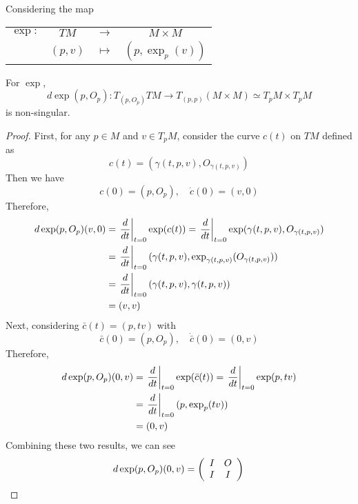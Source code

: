 \noindent Considering the map
\begin{center}
	\begin{tabular}{cccc}
		$\exp \colon$ & $TM$ & $\longrightarrow$ & $M \times M$ \\
		~& $(p,v)$ & $\mapsto$ & $(p,\exp_p(v))$
	\end{tabular}
\end{center}
\begin{lem}
	For $\exp$,
	\begin{equation*}
		d\exp(p,O_p) \colon T_{(p,O_p)}TM \longrightarrow T_{(p,p)}(M \times M) \simeq T_pM \times T_pM
	\end{equation*}
	is non-singular.
\end{lem}
\begin{proof}
	First, for any $p \in M$ and $v \in T_pM$, consider the curve $c(t)$ on $TM$ defined as
	\begin{equation*}
		c(t) = (\gamma(t,p,v),O_{\gamma(t,p,v)})
	\end{equation*}
	Then we have
	\begin{equation*}
		c(0) = (p,O_p),\quad \dot{c}(0) = (v,0)
	\end{equation*}
	Therefore,
	\begin{equation*}
		\begin{aligned}
			d\exp(p,O_p)(v,0) &= \left.\frac{d}{dt}\right\lvert_{t=0}\exp(c(t)) = \left.\frac{d}{dt}\right\lvert_{t=0}\exp(\gamma(t,p,v),O_{\gamma(t,p,v)}) \\
			&= \left.\frac{d}{dt}\right\lvert_{t=0} (\gamma(t,p,v),\exp_{\gamma(t,p,v)}(O_{\gamma(t,p,v)})) \\
			&= \left.\frac{d}{dt}\right\lvert_{t=0} (\gamma(t,p,v),\gamma(t,p,v))\\
			&= (v,v)
		\end{aligned}
	\end{equation*}
	Next, considering $\bar{c}(t) = (p,tv)$ with
	\begin{equation*}
		\bar{c}(0) = (p,O_p),\quad \dot{\bar{c}}(0) = (0,v) 
	\end{equation*}
	Therefore,
	\begin{equation*}
		\begin{aligned}
			d\exp(p,O_p)(0,v) &= \left.\frac{d}{dt}\right\lvert_{t=0}\exp(\bar{c}(t)) = \left.\frac{d}{dt}\right\lvert_{t=0}\exp(p,tv) \\
			&= \left.\frac{d}{dt}\right\lvert_{t=0}(p,\exp_p(tv)) \\
			&= (0,v)
		\end{aligned}
	\end{equation*}
	Combining these two results, we can see
	\begin{equation*}
		d\exp(p,O_p)(0,v) = \left(
			\begin{array}{cc}
				I & O \\
				I & I
			\end{array}
		\right)\qedhere
	\end{equation*}
\end{proof}

